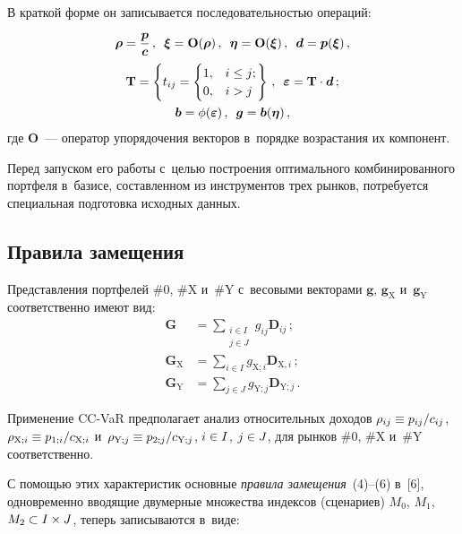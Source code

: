 \begin{multicols}{2}
  В краткой форме он записывается последовательностью операций: 
\begin{multline*}
\boldsymbol{\rho} = \displaystyle\frac{\displaystyle \boldsymbol{p}\mathstrut}{\displaystyle \boldsymbol{c}\mathstrut}\,,\enskip 
\boldsymbol{\xi} = \mathbf{O}(\boldsymbol{\rho})\,,\enskip
\boldsymbol{\eta}= \mathbf{O}(\boldsymbol{\xi})\,, \enskip
\boldsymbol{d} =\boldsymbol{p}(\boldsymbol{\xi})\,,\\
\mathbf{T} = \left\{
t_{ij} =
\begin{cases}
1,& i\leq j;\\
0,& i> j
\end{cases}\right\}
\,,\enskip 
\boldsymbol{\varepsilon}= \mathbf{T}\cdot \boldsymbol{d}\,;\\
\boldsymbol{b}= \phi(\boldsymbol{\varepsilon})\,,\enskip
\boldsymbol{g}= \boldsymbol{b}(\boldsymbol{\eta})\,, 
\end{multline*}
 где $\mathbf{O}$~---  
оператор упорядочения векторов в~порядке возрастания их компонент.
  
  Перед запуском его работы с~целью построения оптимального 
комбинированного портфеля в~базисе, составленном из инструментов трех 
рынков, потребуется специальная подготовка исходных данных. 
  
  \subsection{Правила замещения }
  
  Представления портфелей \#0, \#X и~\#Y с~весовыми векторами 
$\boldsymbol{g}$, $\boldsymbol{g}_{\mathrm{X}}$ 
и~$\boldsymbol{g}_{\mathrm{Y}}$ соответственно имеют вид:
\begin{align*}
  \boldsymbol{G}&=\sum\limits_{\substack{
  {i\in I}\\{j\in J}}} g_{ij}\boldsymbol{D}_{ij}\,;\\
  \boldsymbol{G}_{\mathrm{X}}&= \sum\limits_{i\in I} g_{\mathrm{X};i} 
\boldsymbol{D}_{\mathrm{X},i}\,;\\
 \boldsymbol{G}_{\mathrm{Y}} &=\sum\limits_{j\in J} g_{\mathrm{Y};j}
 \boldsymbol{D}_{\mathrm{Y};j}\,.
\end{align*}
  
  Применение CC-VaR предполагает анализ относительных доходов 
   $\rho_{ij}\hm\equiv p_{ij}/c_{ij}$, 
   $\rho_{\mathrm{X};i}\hm\equiv p_{1;i}/c_{\mathrm{X};i}$ 
и~$\rho_{\mathrm{Y};j}\hm\equiv p_{2;j}/c_{\mathrm{Y};j}$, $i\hm\in I$, $j\hm\in J$, 
для рынков \#0, \#X и~\#Y соответственно.

  С помощью этих характеристик основные \textit{правила замещения}~(4)--(6) 
в~[6], одновременно вводящие двумерные множества индексов (сценариев) 
$M_0$, $M_1$, $M_2 \hm\subset I\times  J$, теперь записываются в~виде:


\end{multicols}
